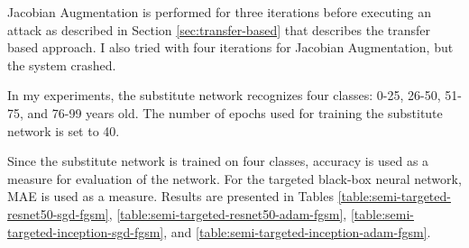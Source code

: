Jacobian Augmentation is performed for three iterations before executing an attack as described in Section \ref{sec:transfer-based} that describes the transfer based approach. I also tried with four iterations for Jacobian Augmentation, but the system crashed. 

In my experiments, the substitute network recognizes four classes: 0-25, 26-50, 51-75, and 76-99 years old. The number of epochs used for training the substitute network is set to 40.

Since the substitute network is trained on four classes, accuracy is used as a measure for evaluation of the network. For the targeted black-box neural network, MAE is used as a measure. Results are presented in Tables
\ref{table:semi-targeted-resnet50-sgd-fgsm},
\ref{table:semi-targeted-resnet50-adam-fgsm}, 
\ref{table:semi-targeted-inception-sgd-fgsm}, and
\ref{table:semi-targeted-inception-adam-fgsm}.


\begin{table}[]
\caption{Substitute network: ResNet50 architecture with SGD optimizer; Attack: FGSM}
\label{table:semi-targeted-resnet50-sgd-fgsm}
\end{table}


